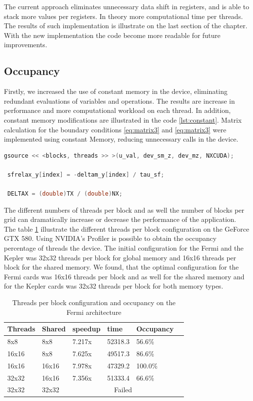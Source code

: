 The current approach eliminates unnecessary data shift in registers, and is able to stack more values per registers. In theory more computational time per threads. The results of such implementation is illustrate on the last section of the chapter. With the new implementation the code become more readable for future improvements. 

\subsection{Occupancy}
 
Firstly, we increased the use of constant memory in the device, eliminating redundant evaluations of variables and operations. The results are increase in performance and more computational workload on each thread. In addition, constant memory modifications are illustrated in the code \ref{lst:constant}. Matrix calculation for the boundary conditions \ref{eq:matrix3} and \ref{eq:matrix3} were implemented using constant Memory, reducing unnecessary calls in the device.
 
 \begin{lstlisting}[language=C++,  label={lst:constant}, caption={Constant Memory changes}]
 gsource << <blocks, threads >> >(u_val, dev_sm_z, dev_mz, NXCUDA);
 
 sfrelax_y[index] = -deltam_y[index] / tau_sf;
     
 DELTAX = (double)TX / (double)NX;
\end{lstlisting}
 
The different numbers of threads per block and as well the number of blocks per grid can dramatically increase or decrease the performance of the application. The table \ref{tab:ocu} illustrate the different threads per block configuration on the GeForce GTX 580. Using NVIDIA's Profiler is possible to obtain the occupancy percentage of threads the device. The initial configuration for the Fermi and the Kepler was 32x32 threads per block for global memory and 16x16 threads per block for the shared memory. We found, that the optimal configuration for the Fermi cards was 16x16 threads per block and as well for the shared memory and for the Kepler cards was 32x32 threads per block for both memory types. 

\begin{table}[h]
\centering
  \begin{tabular} { | l | l | l | l | l | l | }
    \hline
    Threads & Shared & speedup & time & Occupancy \\
    \hline
     8x8 &  8x8 & 7.217x & 52318.3  & 56.6\% \\
    \hline
     16x16 & 8x8 & 7.625x & 49517.3 & 86.6\% \\
    \hline
    16x16 & 16x16 & 7.978x & 47329.2 & 100.0\% \\
    \hline
    32x32 & 16x16 & 7.356x & 51333.4 & 66.6\% \\
    \hline
    32x32 & 32x32 & \multicolumn{3}{|c|}{Failed}\\
    \hline
  \end{tabular}
  \caption{Threads per block configuration and occupancy on the Fermi architecture}
  \label{tab:ocu}
  \end{table}


